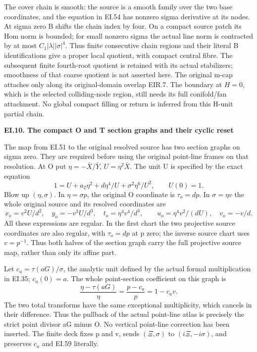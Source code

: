 The cover chain is smooth: the source is a smooth family over
the two base coordinates, and the equation in EI.54 has
nonzero sigma derivative at its nodes. At sigma zero B shifts
the chain index by four. On a compact source patch its Hom
norm is bounded; for small nonzero sigma the actual line norm
is contracted by at most \(C_1|\lambda||\sigma|^4\).
Thus finite consecutive chain regions and their literal B
identifications give a proper local quotient, with compact
central fibre. The subsequent finite fourth-root quotient is
retained with its actual stabilizers; smoothness of that
coarse quotient is not asserted here. The original m-cap
attaches only along its original-domain overlap EIR.7. The
boundary at \(H=0\), which is the selected colliding-node
region, still needs its full conifold/fan attachment. No
global compact filling or return is inferred from this
H-unit partial chain.

\par

\medskip\noindent\textbf{EI.10. The compact O and T section graphs and their cyclic reset}

\par\nobreak

The map from EI.51 to the original resolved source has two section
graphs on sigma zero. They are required before using the original
point-line frames on that resolution. At O put
\(\eta=-\bar X/\bar Y\), \(U=\eta^2\bar X\). The unit U is
specified by the exact equation
\[
 1=U+a_2\eta^2+d\eta^4/U+\sigma^2\eta^6/U^2,
 \qquad U(0)=1.
 \tag{EI.57}
\]
Blow up \((\eta,\sigma)\). In \(\eta=\sigma p\), the original
O coordinate is \(\tau_o=dp\). In \(\sigma=\eta v\) the whole
original source and its resolved coordinates are
\[
 x_o=v^2U/d^2,\quad y_o=-v^3U/d^3,\quad
 t_o=\eta^4v^4/d^3,\qquad
 u_o=\eta^4v^2/(dU),\quad v_o=-v/d.
 \tag{EI.58}
\]
All these expressions are regular. In the first chart the two
projective source coordinates are also regular, with \(\tau_o=dp\)
at p zero; the inverse source chart uses \(v=p^{-1}\).
Thus both halves of the section graph carry the full projective
source map, rather than only its affine part.

Let \(c_a=\tau(aG)/\sigma\), the analytic unit defined by the
actual formal multiplication in EI.35; \(c_a(0)=a\). The whole
point-section coefficient on this graph is
\[
 \frac{\eta-\tau(aG)}{\eta}
       =\frac{p-c_a}{p}=1-c_av.
 \tag{EI.59}
\]
The two total transforms have the same exceptional multiplicity,
which cancels in their difference. Thus the pullback of the actual
point-line atlas is precisely the strict point divisor aG minus O.
No vertical point-line correction has been inserted. The finite deck
fixes p and v, sends \((\Xi,\sigma)\) to
\((i\Xi,-i\sigma)\), and preserves \(c_a\) and EI.59 literally.

